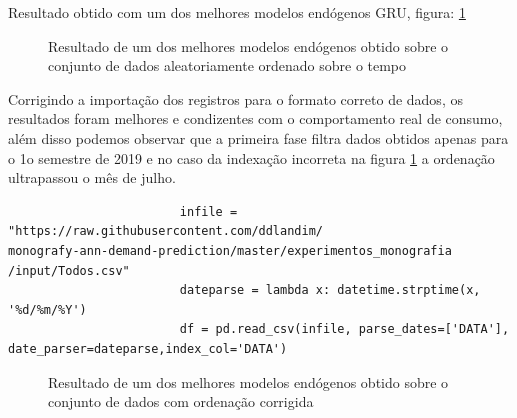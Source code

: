 \documentclass[	12pt, Times, openright, twoside, a4paper, english, brazil]{abntex2}
\begin{document}
    	            Resultado obtido com um dos melhores modelos endógenos GRU, figura: \ref{fig:pandas_wrong_indexing} 
    	            \begin{figure}[!ht]
                    	\caption{Resultado de um dos melhores modelos endógenos obtido sobre o conjunto de dados aleatoriamente ordenado sobre o tempo \label{fig:pandas_wrong_indexing} }
                    \end{figure}
                    \newpage 
                    Corrigindo a importação dos registros para o formato correto de dados, os resultados foram melhores e condizentes com o comportamento real de consumo, além disso podemos observar que a primeira fase filtra dados obtidos apenas para o 1o semestre de 2019 e no caso da indexação incorreta na figura \ref{fig:pandas_wrong_indexing} a ordenação ultrapassou o mês de julho.
                    \begin{lstlisting}
    	                infile = "https://raw.githubusercontent.com/ddlandim/                           monografy-ann-demand-prediction/master/experimentos_monografia                   /input/Todos.csv"
                        dateparse = lambda x: datetime.strptime(x, '%d/%m/%Y')
                        df = pd.read_csv(infile, parse_dates=['DATA'], date_parser=dateparse,index_col='DATA')
    	            \end{lstlisting}
                    \begin{figure}[!ht]
                    	\caption{Resultado de um dos melhores modelos endógenos obtido sobre o conjunto de dados com ordenação corrigida \label{fig:pandas_correct_indexing} }
                    \end{figure}
\end{document}
